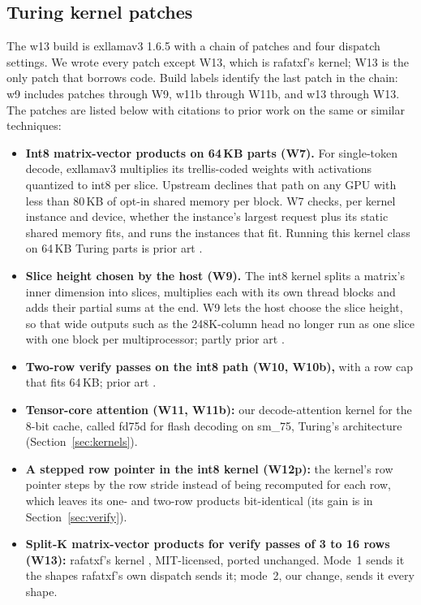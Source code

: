 \documentclass[11pt,letterpaper]{article}
\begin{document}
\subsection{Turing kernel patches}
\label{sec:build}
The w13 build is exllamav3 1.6.5 \citep{turboderp2025exllamav3} with a chain
of patches and four dispatch settings. We wrote every patch except W13, which
is rafatxf's kernel; W13 is the only patch that borrows code. Build labels identify the last patch in the chain: w9 includes patches
through W9, w11b through W11b, and w13 through W13. The patches are listed
below with citations to prior work on the same or similar techniques:
\begin{itemize}\setlength{\itemsep}{1pt}
\item \textbf{Int8 matrix-vector products on 64\,KB parts (W7).} For
single-token decode, exllamav3 multiplies its trellis-coded weights with
activations quantized to int8 per slice. Upstream declines that path on any
GPU with less than 80\,KB of opt-in shared memory per block. W7 checks, per
kernel instance and device, whether the instance's largest request plus its
static shared memory fits, and runs the instances that fit. Running this
kernel class on 64\,KB Turing parts is prior art
\citep{vcruz3052026exl3turing,weicj2026turing,spiritbuun2026buun}.
\item \textbf{Slice height chosen by the host (W9).} The int8 kernel splits a
matrix's inner dimension into slices, multiplies each with its own thread
blocks and adds their partial sums at the end. W9 lets the host choose the
slice height, so that wide outputs such
as the 248K-column head no longer run as one slice with one block per
multiprocessor; partly prior art
\citep{ghazni2026rocm,yamz2026kyojin,spiritbuun2026buun}.
\item \textbf{Two-row verify passes on the int8 path (W10, W10b),} with a row
cap that fits 64\,KB; prior art \citep{weicj2026turing}.
\item \textbf{Tensor-core attention (W11, W11b):} our decode-attention kernel
for the 8-bit cache, called fd75d for flash decoding on sm\_75, Turing's
architecture (Section~\ref{sec:kernels}).
\item \textbf{A stepped row pointer in the int8 kernel (W12p):} the kernel's
row pointer steps by the row stride instead of being recomputed for each row,
which leaves its one- and two-row products bit-identical (its gain is in
Section~\ref{sec:verify}).
\item \textbf{Split-K matrix-vector products for verify passes of 3 to 16
rows (W13):} rafatxf's kernel \citep{rafatxf2026turing}, MIT-licensed, ported
unchanged. Mode~1 sends it the shapes rafatxf's own dispatch sends it;
mode~2, our change, sends it every shape.
\end{itemize}
\end{document}
